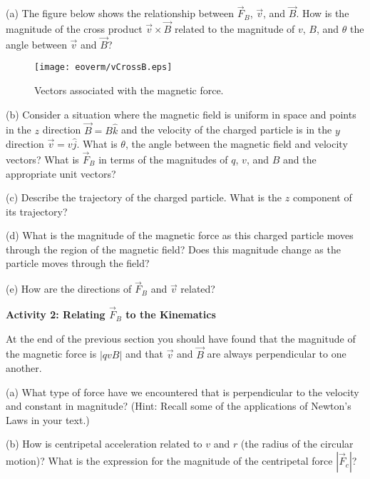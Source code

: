 (a) The figure below shows the relationship between $\vec F_B$, $\vec v$,
and $\vec B$.
How is the magnitude of the cross product $\vec v \times \vec B$ related to
the magnitude of $v$, $B$, and $\theta$ the angle between $\vec v$ 
and $\vec B$?
\vspace{5mm}

\begin{figure}[h!]
\begin{center}
\texttt{[image: eoverm/vCrossB.eps]}
\caption{Vectors associated with the magnetic force. \hfill}
\end{center}
\end{figure}

(b) Consider a situation where the magnetic field is uniform in space
and points in the $z$ direction $\vec B = B \hat k$ and the velocity of
the charged particle is in the $y$ direction $\vec v = v \hat j$. 
What is $\theta$, the angle between the magnetic field and velocity vectors?
What is 
$\vec F_B$ in terms of the magnitudes of $q$, $v$, and $B$ and the appropriate unit
vectors?
\vspace{25mm}


(c) Describe the trajectory of the charged particle.
What is the $z$ component of its trajectory?
\vspace{30mm}

(d) What is the magnitude of the magnetic force as this charged particle
moves through the region of the magnetic field?
Does this magnitude change as the particle moves through the field?
\vspace{15mm}

(e) How are the directions of $\vec F_B$ and $\vec v$ related?
\vspace{15mm}


\textbf{Activity 2: Relating $\vec F_B$ to the Kinematics}

At the end of the previous section you should have found that the magnitude 
of the magnetic force is $|qvB|$ and that $\vec v$ and $\vec B$ are
always perpendicular to one another.

(a) What type of force have we encountered 
that is perpendicular to the velocity and constant in magnitude?
(Hint: Recall some of the applications of Newton's Laws in your text.)
\vspace{15mm}

(b) How is centripetal acceleration related to $v$ and $r$ (the radius of the
circular motion)? What is the expression for the magnitude of
the centripetal force $|\vec F_c|$?
\vspace{15mm}

